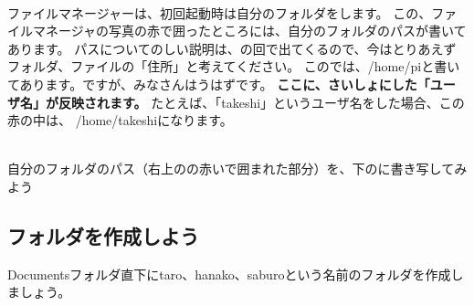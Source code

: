 \documentclass[a4paper,12pt]{jarticle}
\begin{document}
\\ファイルマネージャーは、初回起動時は自分のフォルダをします。
この、ファイルマネージャの写真の赤で囲ったところには、自分のフォルダのパスが書いてあります。
パスについてのしい説明は、の回で出てくるので、今はとりあえずフォルダ、ファイルの「住所」と考えてください。
このでは、/home/piと書いてあります。ですが、みなさんはうはずです。
\textbf{\color{red}ここに、さいしょにした「ユーザ名」が反映されます。}
たとえば、「takeshi」というユーザ名をした場合、この赤の中は、
/home/takeshiになります。
\vspace{20pt}

\theQuestion\\
自分のフォルダのパス（右上のの赤いで囲まれた部分）を、下のに書き写してみよう
\clearpage

\subsection{\theExercise フォルダを作成しよう}
Documentsフォルダ直下にtaro、hanako、saburoという名前のフォルダを作成しましょう。\\
\end{document}
